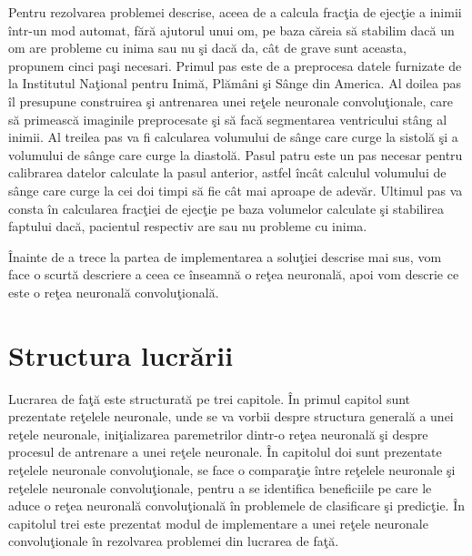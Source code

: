 Pentru rezolvarea problemei descrise, aceea de a calcula frac\c{t}ia de ejec\c{t}ie a inimii \^{i}ntr-un mod automat, f\u{a}r\u{a} ajutorul unui om, pe baza c\u{a}reia s\u{a} stabilim dac\u{a} un om are probleme cu inima sau nu \c{s}i dac\u{a} da, c\^{a}t de grave sunt aceasta, propunem cinci pa\c{s}i necesari. Primul pas este de a preprocesa datele furnizate de la Institutul Na\c{t}ional pentru Inim\u{a}, Pl\u{a}m\^{a}ni \c{s}i S\^{a}nge din America. Al doilea pas \^{i}l presupune construirea \c{s}i antrenarea unei re\c{t}ele neuronale convolu\c{t}ionale, care s\u{a} primeasc\u{a} imaginile preprocesate \c{s}i s\u{a} fac\u{a} segmentarea ventricului st\^{a}ng al inimii. Al treilea pas va fi calcularea volumului de s\^{a}nge care curge la sistol\u{a} \c{s}i a volumului de s\^{a}nge care curge la diastol\u{a}. Pasul patru este un pas necesar pentru calibrarea datelor calculate la pasul anterior, astfel \^{i}nc\^{a}t calculul volumului de s\^{a}nge care curge la cei doi timpi s\u{a} fie c\^{a}t mai aproape de adev\u{a}r. Ultimul pas va consta \^{i}n calcularea frac\c{t}iei de ejec\c{t}ie pe baza volumelor calculate \c{s}i stabilirea faptului dac\u{a}, pacientul respectiv are sau nu probleme cu inima. 

\par

\^{I}nainte de a trece la partea de implementarea a solu\c{t}iei descrise mai sus, vom face o scurt\u{a} descriere a ceea ce \^{i}nseamn\u{a} o re\c{t}ea neuronal\u{a}, apoi vom descrie ce este o re\c{t}ea neuronal\u{a} convolu\c{t}ional\u{a}.

\section{Structura lucr\u{a}rii}

Lucrarea de fa\c{t}\u{a} este structurat\u{a} pe trei capitole. \^{I}n primul capitol sunt prezentate re\c{t}elele neuronale, unde se va vorbii despre structura general\u{a} a unei re\c{t}ele neuronale, ini\c{t}ializarea paremetrilor dintr-o re\c{t}ea neuronal\u{a} \c{s}i despre procesul de antrenare a unei re\c{t}ele neuronale. \^{I}n capitolul doi sunt prezentate re\c{t}elele neuronale convolu\c{t}ionale, se face o compara\c{t}ie \^{i}ntre re\c{t}elele neuronale \c{s}i re\c{t}elele neuronale convolu\c{t}ionale, pentru a se identifica beneficiile pe care le aduce o re\c{t}ea neuronal\u{a} convolu\c{t}ional\u{a} \^{i}n problemele de clasificare \c{s}i predic\c{t}ie. \^{I}n capitolul trei este prezentat modul de implementare a unei re\c{t}ele neuronale convolu\c{t}ionale \^{i}n rezolvarea problemei din lucrarea de fa\c{t}\u{a}.